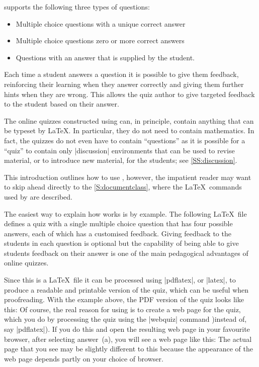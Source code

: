 \documentclass[svgnames]{article}
\begin{document}
      \WebQuiz supports the following three types of questions:
      \begin{itemize}
        \item Multiple choice questions with a unique correct answer
        \item Multiple choice questions zero or more correct answers
        \item Questions with an answer that is supplied by the student.
      \end{itemize}
      Each time a student answers a question it is possible to give them
      feedback, reinforcing their learning when they answer correctly and
      giving them further hints when they are wrong. This allows the
      quiz author to give targeted feedback to the student based on their
      answer.

      The online quizzes constructed using \WebQuiz can, in principle,
      contain anything that can be typeset by \LaTeX. In particular, they
      do not need to contain mathematics. In fact, the quizzes do not even
      have to contain ``questions'' as it is possible for a \WebQuiz
      ``quiz'' to contain only \LatexCode|discussion| environments that can
      be used to revise material, or to introduce new material, for the
      students; see \autoref{SS:discussion}.

      This introduction outlines how to use \WebQuiz, however, the
      impatient reader may want to skip ahead directly to the
      \autoref{S:documentclass}, where the \LaTeX\ commands used by
      \WebQuiz are described.

      The easiest way to explain how \WebQuiz works is by example. The
      following \LaTeX\ file defines a quiz with a single multiple choice
      question that has four possible answers, each of which has a
      customised feedback. Giving feedback to the students in each
      question is optional but the capability of being able to give
      students feedback on their answer is one of the main pedagogical
      advantages of online quizzes.


      Since this is a \LaTeX\ file it can be processed using
      \BashCode|pdflatex|, or \BashCode|latex|, to produce a readable and
      printable version of the quiz, which can be useful when
      proofreading. With the example above, the PDF version of the quiz looks
      like this:
      Of course, the real reason for using \WebQuiz is to create a
      web page for the quiz, which you do by processing the quiz using
      the \BashCode|webquiz| command )instead of, say
      \BashCode|pdflatex|). If you do this and open the resulting
      web page in your favourite browser, after selecting answer~(a), you
      will see a web page like this:
      The actual page that you see may be slightly different to
      this because the appearance of the web page depends partly on your
      choice of browser.
\end{document}
